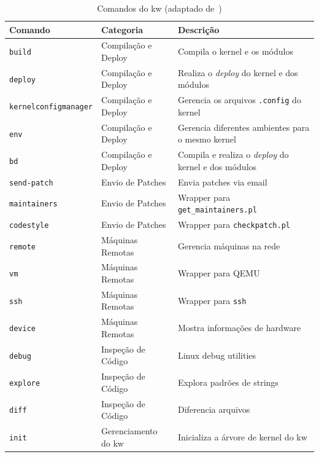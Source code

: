 \begin{table}[ht]
    \caption{Comandos do kw (adaptado de~\cite{tadokoro2025kworkflow})}
    \label{tab:kw-commands}
    \begin{center}
    \begin{tabular}{|p{}|p{}|p{}|}
        \hline
        \rowcolor{gray!20}
        \textbf{Comando} & \textbf{Categoria} & \textbf{Descrição} \\\hline
        \texttt{build}    & Compilação e Deploy    & Compila o kernel e os módulos \\\hline
        \texttt{deploy}    & Compilação e Deploy    & Realiza o \emph{deploy} do kernel e dos módulos \\\hline
        \texttt{kernel\-config\-manager}    & Compilação e Deploy    & Gerencia os arquivos \texttt{.config} do kernel \\\hline
        \texttt{env}    & Compilação e Deploy    & Gerencia diferentes ambientes para o mesmo kernel \\\hline
        \texttt{bd}    & Compilação e Deploy    & Compila e realiza o \emph{deploy} do kernel e dos módulos \\\hline
        \texttt{send-patch}    & Envio de Patches    & Envia patches via email \\\hline
        \texttt{maintainers}    & Envio de Patches    & Wrapper para \texttt{get\_maintai\-ners.pl} \\\hline
        \texttt{codestyle}    & Envio de Patches    & Wrapper para \texttt{checkpatch.pl} \\\hline
        \texttt{remote}    & Máquinas Remotas    & Gerencia máquinas na rede \\\hline
        \texttt{vm}    & Máquinas Remotas    & Wrapper para QEMU \\\hline
        \texttt{ssh}    & Máquinas Remotas    & Wrapper para \texttt{ssh} \\\hline
        \texttt{device}    & Máquinas Remotas    & Mostra informações de hardware \\\hline
        \texttt{debug}    & Inspeção de Código    & Linux debug utilities \\\hline
        \texttt{explore}    & Inspeção de Código    & Explora padrões de strings \\\hline
        \texttt{diff}    & Inspeção de Código    & Diferencia arquivos \\\hline
        \texttt{init}    & Gerenciamento do kw    & Inicializa a árvore de kernel do kw \\\hline

\end{tabular}
\end{center}
\end{table}

